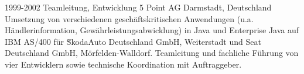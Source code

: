 \cventry
{1999-2002}
{Teamleitung, Entwicklung}
{}
{5 Point AG}
{Darmstadt, Deutschland}
{
  Umsetzung von verschiedenen geschäftskritischen Anwendungen (u.a. Händlerinformation,
  Gewährleistungsabwicklung) in Java und Enterprise Java auf IBM AS/400 für \u SkodaAuto Deutschland GmbH,
  Weiterstadt und Seat Deutschland GmbH, Mörfelden-Walldorf. Teamleitung und fachliche Führung
  von vier Entwicklern sowie technische Koordination mit Auftraggeber.
}
